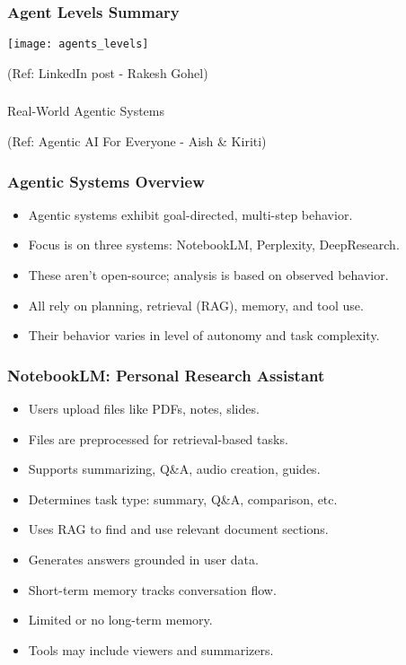 \begin{frame}[fragile]\frametitle{Agent Levels Summary}
\begin{center}
\texttt{[image: agents\_levels]}
\end{center}

{\tiny (Ref: LinkedIn post - Rakesh Gohel)}
\end{frame}


\begin{frame}[fragile]\frametitle{}
\begin{center}
{\Large Real-World Agentic Systems}

{\tiny (Ref: Agentic AI For Everyone - Aish \& Kiriti)}
\end{center}
\end{frame}

\begin{frame}[fragile]\frametitle{Agentic Systems Overview}
    \begin{itemize}
        \item Agentic systems exhibit goal-directed, multi-step behavior.
        \item Focus is on three systems: NotebookLM, Perplexity, DeepResearch.
        \item These aren't open-source; analysis is based on observed behavior.
        \item All rely on planning, retrieval (RAG), memory, and tool use.
        \item Their behavior varies in level of autonomy and task complexity.
    \end{itemize}
\end{frame}

\begin{frame}[fragile]\frametitle{NotebookLM: Personal Research Assistant}
    \begin{itemize}
        \item Users upload files like PDFs, notes, slides.
        \item Files are preprocessed for retrieval-based tasks.
        \item Supports summarizing, Q&A, audio creation, guides.
        \item Determines task type: summary, Q&A, comparison, etc.
        \item Uses RAG to find and use relevant document sections.
        \item Generates answers grounded in user data.
        \item Short-term memory tracks conversation flow.
        \item Limited or no long-term memory.
        \item Tools may include viewers and summarizers.
    \end{itemize}
\end{frame}

